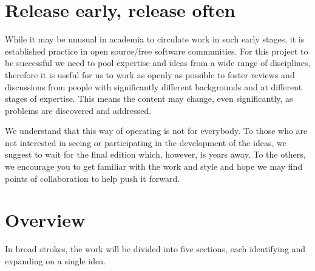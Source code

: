 \documentclass[11pt,letterpaper,fleqn]{memoir} %
\begin{document}
\section*{Release early, release often}

While it may be unusual in academia to circulate work in such early stages, it is established practice in open source/free software communities. For this project to be successful we need to pool expertise and ideas from a wide range of disciplines, therefore it is useful for us to work as openly as possible to foster reviews and discussions from people with significantly different backgrounds and at different stages of expertise. This means the content may change, even significantly, as problems are discovered and addressed.

We understand that this way of operating is not for everybody. To those who are not interested in seeing or participating in the development of the ideas, we suggest to wait for the final edition which, however, is years away. To the others, we encourage you to get familiar with the work and style and hope we may find points of collaboration to help push it forward. 

\section*{Overview}

In broad strokes, the work will be divided into five sections, each identifying and expanding on a single idea.
\end{document}
